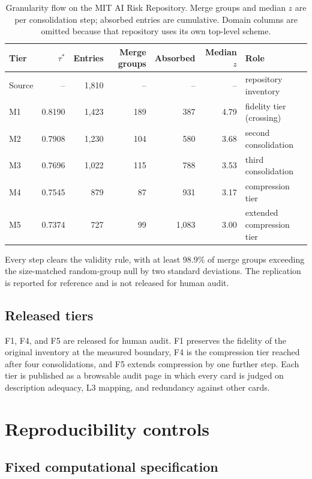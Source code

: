 \documentclass[11pt,a4paper]{article}
\begin{document}
\begin{table}[H]
\centering
\caption{Granularity flow on the MIT AI Risk Repository. Merge groups and median
$z$ are per consolidation step; absorbed entries are cumulative. Domain columns
are omitted because that repository uses its own top-level scheme.}
\label{tab:mittiers}
\small
\begin{tabularx}{\linewidth}{lrrrrrY}
\toprule
Tier & $\tau^{*}$ & Entries & Merge groups & Absorbed & Median $z$ & Role \\
\midrule
Source & --     & 1,810 & --  & --    & --   & repository inventory \\
M1     & 0.8190 & 1,423 & 189 & 387   & 4.79 & fidelity tier (crossing) \\
M2     & 0.7908 & 1,230 & 104 & 580   & 3.68 & second consolidation \\
M3     & 0.7696 & 1,022 & 115 & 788   & 3.53 & third consolidation \\
M4     & 0.7545 & 879   & 87  & 931   & 3.17 & compression tier \\
M5     & 0.7374 & 727   & 99  & 1,083 & 3.00 & extended compression tier \\
\bottomrule
\end{tabularx}
\end{table}

Every step clears the validity rule, with at least 98.9\% of merge groups
exceeding the size-matched random-group null by two standard deviations. The
replication is reported for reference and is not released for human audit.

\subsection{Released tiers}

F1, F4, and F5 are released for human audit. F1 preserves the fidelity of the
original inventory at the measured boundary, F4 is the compression tier reached
after four consolidations, and F5 extends compression by one further step. Each
tier is published as a browsable audit page in which every card is judged on
description adequacy, L3 mapping, and redundancy against other cards.

\section{Reproducibility controls}

\subsection{Fixed computational specification}
\end{document}
